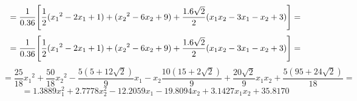 \begin{enumerate}[label=(\alph*)]
\[        =
        \frac{1}{0.36}
        \Bigg{[}
            \frac{1}{2}
            ({x_1}^{2} - 2x_1 + 1)
            +
            ({x_2}^{2} - 6x_2 + 9)
            +
            \frac{1.6\sqrt{2}}{2}
            (x_1 x_2 -3x_1 - x_2 + 3)
        \Bigg{]}
        =
    \]
    \[
        =
        \frac{1}{0.36}
        \Bigg{[}
            \frac{1}{2}
            ({x_1}^{2} - 2x_1 + 1)
            +
            ({x_2}^{2} - 6x_2 + 9)
            +
            \frac{1.6\sqrt{2}}{2}
            (x_1 x_2 -3x_1 - x_2 + 3)
        \Bigg{]}
        =
    \]
    \[
        =
        \frac{25}{18}
        {x_1}^{2}
        +
        \frac{50}{18}
        {x_2}^{2}
        -
        \frac{5(5+12\sqrt{2})}{9}
        x_1
        -
        x_2
        \frac{10(15 + 2\sqrt{2})}{9}
        +
        \frac{20\sqrt{2}}{9}
        x_1
        x_2
        +
        \frac{5(95+24\sqrt{2})}{18}
        =
    \]
    \[
        =
        1.3889
        x_1^2
        +
        2.7778
        x_2^2
        -
        12.2059
        x_1
        -
        19.8094
        x_2
        +
        3.1427
        x_1 x_2
        +
        35.8170
    \]
\end{enumerate}